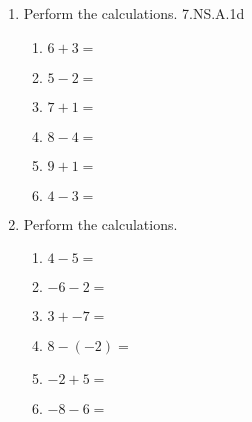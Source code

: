 \documentclass[12pt, twoside]{article}
\begin{document}
\begin{enumerate}
    \item Perform the calculations. \hfill 7.NS.A.1d
      \begin{multicols}{2}
        \begin{enumerate}[itemsep=0.75cm]
          \item $6 + 3 =$
          \item $5 - 2 =$
          \item $7 + 1 =$
          \item $8 - 4 =$
          \item $9 + 1 =$
          \item $4 - 3 =$
        \end{enumerate}
        \end{multicols} \vspace{0.25cm}

    \item Perform the calculations.
      \begin{multicols}{2}
        \begin{enumerate}[itemsep=0.75cm]
          \item $4 - 5 =$
          \item $-6 - 2 =$
          \item $3 + -7 =$
          \item $8 - (-2) =$
          \item $-2 + 5 =$
          \item $-8 - 6 =$
        \end{enumerate}
        \end{multicols} 

\end{enumerate}
\end{document}
